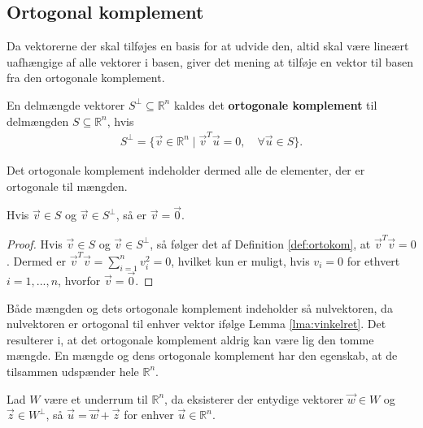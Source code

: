 \subsection{Ortogonal komplement}
Da vektorerne der skal tilføjes en basis for at udvide den, altid skal være lineært uafhængige af alle vektorer i basen, giver det mening at tilføje en vektor til basen fra den ortogonale komplement.
\begin{defn}
En delmængde vektorer $S^{\bot} \subseteq \mathds{R}^n$ kaldes det \textbf{ortogonale komplement} til delmængden $S \subseteq \mathds{R}^n$, hvis 
\begin{align*}
	S^{\bot} = \{\vec{v} \in \mathds{R}^n \mid \vec{v}^T\vec{u} = 0, \quad \forall \vec{u} \in S\}.
\end{align*}
\label{def:ortokom}
\end{defn}
Det ortogonale komplement indeholder dermed alle de elementer, der er ortogonale til mængden.
\begin{prop}
Hvis $\vec{v} \in S$ og $\vec{v} \in S^{\bot}$, så er  $\vec{v}=\vec{0}$.
\label{prop:nulortokomp}
\end{prop}
\begin{proof}
Hvis $\vec{v} \in S$ og $\vec{v} \in S^{\bot}$, så følger det af Definition \ref{def:ortokom}, at $\vec{v}^T\vec{v} = 0$.
Dermed er $\vec{v}^T\vec{v} = \sum_{i=1}^n v_i^2 =0$, hvilket kun er muligt, hvis $v_i = 0$ for ethvert $i = 1,..., n$, hvorfor $\vec{v}=\vec{0}$.
\end{proof}
Både mængden og dets ortogonale komplement indeholder  så nulvektoren, da nulvektoren er ortogonal til enhver vektor ifølge Lemma \ref{lma:vinkelret}. 
Det resulterer i, at det ortogonale komplement aldrig kan være lig den tomme mængde.
En mængde og dens ortogonale komplement har den egenskab, at de tilsammen udspænder hele $\mathds{R}^n$.
\begin{stn}
Lad $W$ være et underrum til $\mathds{R}^n$, da eksisterer der entydige vektorer  $\vec{w} \in W$ og $\vec{z} \in W^{\bot}$, så $\vec{u}= \vec{w}+\vec{z}$ for enhver $\vec{u} \in \mathds{R}^n$.
\label{stn:Rnorto}
\end{stn}
